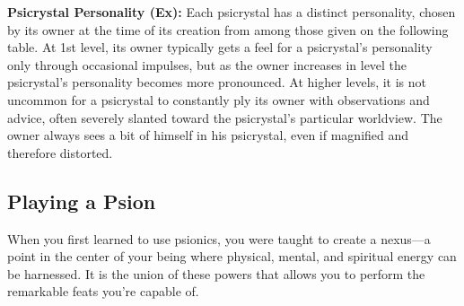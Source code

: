 
\textbf{Psicrystal Personality (Ex):} Each psicrystal has a distinct personality, chosen by its owner at the time of its creation from among those given on the following table. At 1st level, its owner typically gets a feel for a psicrystal's personality only through occasional impulses, but as the owner increases in level the psicrystal's personality becomes more pronounced. At higher levels, it is not uncommon for a psicrystal to constantly ply its owner with observations and advice, often severely slanted toward the psicrystal's particular worldview. The owner always sees a bit of himself in his psicrystal, even if magnified and therefore distorted.

\subsection{Playing a Psion}
When you first learned to use psionics, you were taught to create a nexus---a point in the center of your being where physical, mental, and spiritual energy can be harnessed. It is the union of these powers that allows you to perform the remarkable feats you're capable of.

